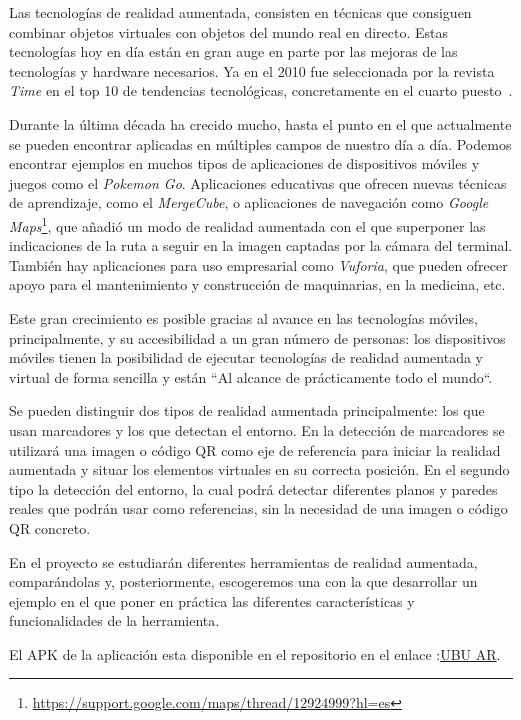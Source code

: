 
Las tecnologías de realidad aumentada, consisten en técnicas que consiguen combinar objetos virtuales con objetos del mundo real en directo. 
Estas tecnologías hoy en día están en gran auge en parte por las mejoras de las tecnologías y hardware necesarios. Ya en el 2010 fue seleccionada por la revista \textit{Time} en el top 10 de tendencias tecnológicas, concretamente en el cuarto puesto~\cite{fletcher_2010}. 

Durante la última década ha crecido mucho, hasta el punto en el que actualmente se pueden encontrar aplicadas en múltiples campos de nuestro día a día. Podemos encontrar ejemplos en muchos tipos de aplicaciones de dispositivos móviles y juegos como el \textit{Pokemon Go}. Aplicaciones educativas que ofrecen nuevas técnicas de aprendizaje, como el \textit{MergeCube}, o aplicaciones de navegación como \textit{Google Maps}\footnote{\url{https://support.google.com/maps/thread/12924999?hl=es}}, que añadió un modo de realidad aumentada con el que superponer las indicaciones de la ruta a seguir en la imagen captadas por la cámara del terminal. También hay aplicaciones para uso empresarial como \textit{Vuforia}, que pueden ofrecer apoyo para el mantenimiento y construcción de maquinarias, en la medicina, etc.

Este gran crecimiento es posible gracias al avance en las tecnologías móviles, principalmente, y su accesibilidad a un gran número de personas: los dispositivos móviles tienen la posibilidad de ejecutar tecnologías de realidad aumentada y virtual de forma sencilla y están ``Al alcance de prácticamente todo el mundo``.




Se pueden distinguir dos tipos de realidad aumentada principalmente: los que usan marcadores y los que detectan el entorno. En la detección de marcadores se utilizará una imagen o código QR como eje de referencia para iniciar la realidad aumentada y situar los elementos virtuales en su correcta posición. 
En el segundo tipo la detección del entorno, la cual podrá detectar diferentes planos y paredes reales que podrán usar como referencias, sin la necesidad de una imagen o código QR concreto.


En el proyecto se estudiarán diferentes herramientas de realidad aumentada, comparándolas y, posteriormente, escogeremos una con la que desarrollar un ejemplo en el que poner en práctica las diferentes características y funcionalidades de la herramienta.

El APK de la aplicación esta disponible en el repositorio en el enlace :\href{https://github.com/smi0010/TFG_Herramientas_Realidad_Aumentada/releases/tag/UBU_AR}{UBU AR}.

